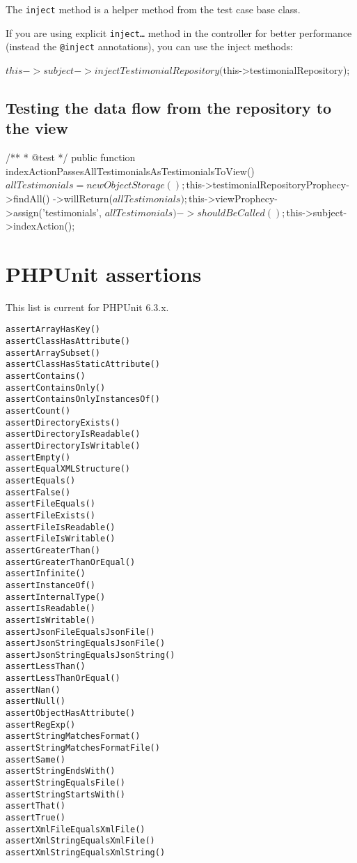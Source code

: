 \documentclass[a4paper,11pt,headsepline]{scrartcl}
\begin{document}
The \texttt{inject} method is a helper method from the test case base class.

If you are using explicit \texttt{inject…} method in the controller for better performance (instead the \texttt{@inject} annotations), you can use the inject methods:

\begin{phpcode}
$this->subject->injectTestimonialRepository($this->testimonialRepository);
\end{phpcode}


\subsection{Testing the data flow from the repository to the view}

\begin{phpcode}
/**
  * @test
  */
public function indexActionPassesAllTestimonialsAsTestimonialsToView()
{
    $allTestimonials = new ObjectStorage();
    $this->testimonialRepositoryProphecy->findAll()
        ->willReturn($allTestimonials);

    $this->viewProphecy->assign('testimonials', $allTestimonials)
        ->shouldBeCalled();

    $this->subject->indexAction();
}
\end{phpcode}





\pagebreak
\section{PHPUnit assertions}
This list is current for PHPUnit 6.3.x.

\begin{verbatim}
assertArrayHasKey()
assertClassHasAttribute()
assertArraySubset()
assertClassHasStaticAttribute()
assertContains()
assertContainsOnly()
assertContainsOnlyInstancesOf()
assertCount()
assertDirectoryExists()
assertDirectoryIsReadable()
assertDirectoryIsWritable()
assertEmpty()
assertEqualXMLStructure()
assertEquals()
assertFalse()
assertFileEquals()
assertFileExists()
assertFileIsReadable()
assertFileIsWritable()
assertGreaterThan()
assertGreaterThanOrEqual()
assertInfinite()
assertInstanceOf()
assertInternalType()
assertIsReadable()
assertIsWritable()
assertJsonFileEqualsJsonFile()
assertJsonStringEqualsJsonFile()
assertJsonStringEqualsJsonString()
assertLessThan()
assertLessThanOrEqual()
assertNan()
assertNull()
assertObjectHasAttribute()
assertRegExp()
assertStringMatchesFormat()
assertStringMatchesFormatFile()
assertSame()
assertStringEndsWith()
assertStringEqualsFile()
assertStringStartsWith()
assertThat()
assertTrue()
assertXmlFileEqualsXmlFile()
assertXmlStringEqualsXmlFile()
assertXmlStringEqualsXmlString()
\end{verbatim}


\end{document}
